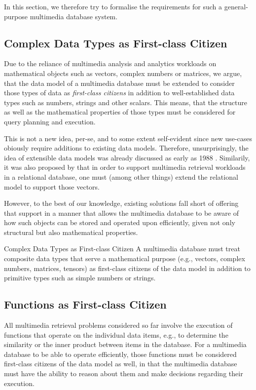 In this section, we therefore try to formalise the requirements for such a general-purpose multimedia database system.

\subsection{Complex Data Types as First-class Citizen}
Due to the reliance of multimedia analysis and analytics workloads on mathematical objects such as vectors, complex numbers or matrices, we argue, that the data model of a multimedia database must be extended to consider those types of data as \emph{first-class citizens} in addition to well-established data types such as numbers, strings and other scalars. This means, that the structure as well as the mathematical properties of those types must be considered for query planning and execution.

This is not a new idea, per-se, and to some extent self-evident since new use-cases obiously require additions to existing data models. Therefore, unsurprisingly, the idea of extensible data models was already discussed as early as 1988 \cite{Linnemann:1988Design}. Similarily, it was also proposed by \cite{Giangreco:2018Database} that in order to support multimedia retrieval workloads in a relational database, one must (among other things) extend the relational model to support those vectors. 

However, to the best of our knowledge, existing solutions fall short of offering that support in a manner that allows the multimedia database to be aware of how such objects can be stored and operated upon efficiently, given not only structural but also mathematical properties.

\begin{requirement}[label=requirement:complex_data_types]{Complex Data Types as First-class Citizen}{}
    A multimedia database must treat composite data types that serve a mathematical purpose (e.g., vectors, complex numbers, matrices, tensors) as first-class citizens of the data model in addition to primitive types such as simple numbers or strings.
\end{requirement}

\subsection{Functions as First-class Citizen}

All multimedia retrieval problems considered so far involve the execution of functions that operate on the individual data items, e.g., to determine the similarity or the inner product between items in the database. For a multimedia database to be able to operate efficiently, those functions must be considered first-class citizens of the data model as well, in that the multimedia database must have the ability to reason about them and make decisions regarding their execution.

